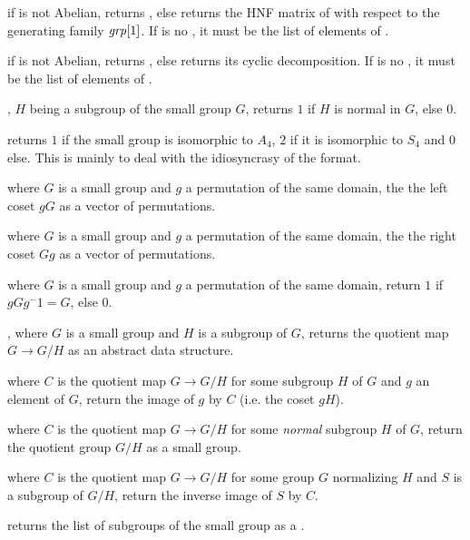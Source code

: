  if  is not Abelian,
returns , else returns the HNF matrix of  with respect to
the generating family $\hbox{\it grp\/}[1]$. If  is no , it must
be the list of elements of .

 if  is not Abelian,
returns , else returns its cyclic decomposition. If  is no
, it must be the list of elements of .

, $H$ being a subgroup of the
small group $G$, returns $1$ if $H$ is normal in $G$, else $0$.

 returns $1$ if the small group
 is isomorphic to $A_4$, $2$ if it is isomorphic to $S_4$ and
$0$ else. This is mainly to deal with the idiosyncrasy of the format.

 where $G$ is a small group and $g$ a
permutation of the same domain, the the left coset $gG$ as a vector of
permutations.

 where $G$ is a small group and $g$ a
permutation of the same domain, the the right coset $Gg$  as a vector of permutations.

 where $G$ is a small group and
$g$ a permutation of the same domain, return $1$ if $gGg^-1=G$, else $0$.

, where $G$ is a small group and
$H$ is a subgroup of $G$, returns the quotient map $G\rightarrow G/H$
as an abstract data structure.

 where $C$ is the quotient map
$G\rightarrow G/H$ for some subgroup $H$ of $G$ and $g$ an element of $G$,
return the image of $g$ by $C$ (i.e. the coset $gH$).

 where $C$ is the quotient map
$G\rightarrow G/H$ for some \emph{normal} subgroup $H$ of $G$, return the
quotient group $G/H$ as a small group.

 where $C$ is the
quotient map $G\rightarrow G/H$ for some group $G$ normalizing $H$ and $S$ is
a subgroup of $G/H$, return the inverse image of $S$ by $C$.

 returns the list of subgroups of the
small group  as a .


